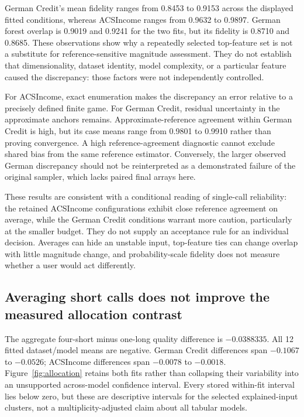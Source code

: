 \documentclass{article}
\begin{document}
German Credit's mean fidelity ranges from 0.8453 to 0.9153 across the displayed fitted conditions, whereas ACSIncome ranges from 0.9632 to 0.9897. German forest overlap is 0.9019 and 0.9241 for the two fits, but its fidelity is 0.8710 and 0.8685. These observations show why a repeatedly selected top-feature set is not a substitute for reference-sensitive magnitude assessment. They do not establish that dimensionality, dataset identity, model complexity, or a particular feature caused the discrepancy: those factors were not independently controlled.

For ACSIncome, exact enumeration makes the discrepancy an error relative to a precisely defined finite game. For German Credit, residual uncertainty in the approximate anchors remains. Approximate-reference agreement within German Credit is high, but its case means range from 0.9801 to 0.9910 rather than proving convergence. A high reference-agreement diagnostic cannot exclude shared bias from the same reference estimator. Conversely, the larger observed German discrepancy should not be reinterpreted as a demonstrated failure of the original sampler, which lacks paired final arrays here.

These results are consistent with a conditional reading of single-call reliability: the retained ACSIncome configurations exhibit close reference agreement on average, while the German Credit conditions warrant more caution, particularly at the smaller budget. They do not supply an acceptance rule for an individual decision. Averages can hide an unstable input, top-feature ties can change overlap with little magnitude change, and probability-scale fidelity does not measure whether a user would act differently.

\subsection{Averaging short calls does not improve the measured allocation contrast}
The aggregate four-short minus one-long quality difference is $-0.0388335$. All 12 fitted dataset/model means are negative. German Credit differences span $-0.1067$ to $-0.0526$; ACSIncome differences span $-0.0078$ to $-0.0018$. Figure~\ref{fig:allocation} retains both fits rather than collapsing their variability into an unsupported across-model confidence interval. Every stored within-fit interval lies below zero, but these are descriptive intervals for the selected explained-input clusters, not a multiplicity-adjusted claim about all tabular models.
\end{document}
